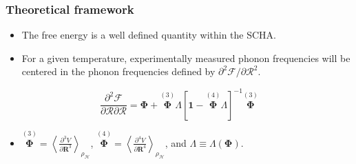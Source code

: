 \documentclass{beamer}
\begin{document}
\begin{frame}

\frametitle{Theoretical framework}
\begin{itemize}
 \item The free energy is a well defined quantity within the SCHA.
 \item For a given temperature, experimentally measured phonon frequencies will be centered in the phonon frequencies defined by $\partial^{2}\mathcal{F}/\partial\boldsymbol{\mathcal{R}}^{2}$.
\end{itemize}
\begin{equation}
\nonumber
 \frac{\partial^{2}\mathcal{F}}{\partial\boldsymbol{\mathcal{R}}\partial\boldsymbol{\mathcal{R}}}=\boldsymbol{\Phi}+\overset{(3)}{\boldsymbol{\Phi}}\Lambda[\boldsymbol{1}-\overset{(4)}{\boldsymbol{
 \Phi}}\Lambda]^{-1}\overset{(3)}{\boldsymbol{\Phi}}
\end{equation}
\begin{itemize}
 \item $\overset{(3)}{\boldsymbol{\Phi}}=\left\langle\frac{\partial^{3}V}{\partial\boldsymbol{R}^{3}}\right\rangle_{\rho_{\mathcal{H}}}$, \hspace{0.2cm}
       $\overset{(4)}{\boldsymbol{\Phi}}=\left\langle\frac{\partial^{4}V}{\partial\boldsymbol{R}^{4}}\right\rangle_{\rho_{\mathcal{H}}}$, and
       $\Lambda\equiv\Lambda(\boldsymbol{\Phi})$.
\end{itemize}

\end{frame}

\end{document}
